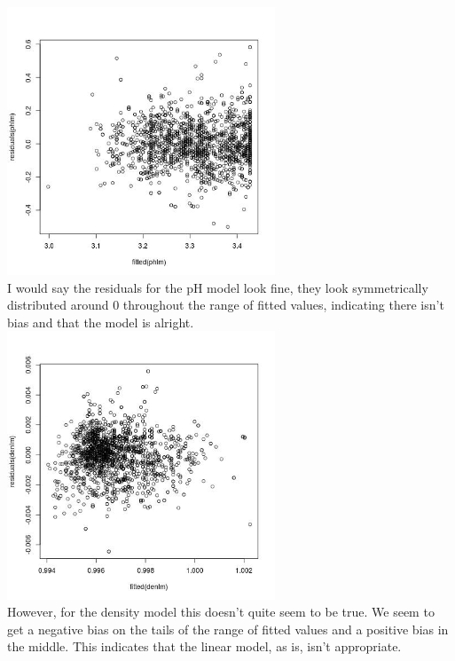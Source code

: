 \documentclass[11pt]{article}
\theoremstyle{definition}
\begin{document}
\begin{enumerate}
\begin{enumerate}
                \\ \includegraphics[width=8cm]{hw1_4d_pHresiduals} \\
                I would say the residuals for the pH model look fine, they look symmetrically distributed around 0 throughout the range of fitted values, indicating there isn't bias and that the model is alright.
                \\ \includegraphics[width=8cm]{hw1_4d_denresiduals} \\
                However, for the density model this doesn't quite seem to be true. We seem to get a negative bias on the tails of the range of fitted values and a positive bias in the middle. This indicates that the linear model, as is, isn't appropriate.


\end{enumerate}
\end{enumerate}
\end{document}
